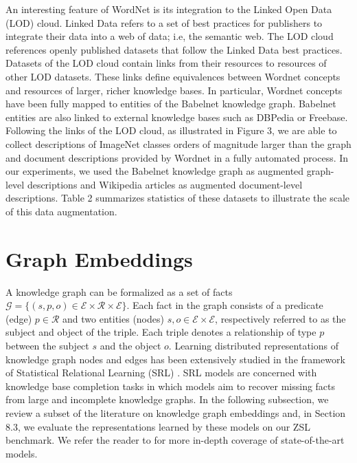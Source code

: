 An interesting feature of WordNet is its integration to the Linked Open Data (LOD) cloud. Linked Data \cite{yu2011linked} refers to a set of best practices for publishers to integrate their data into a web of data; i.e, the semantic web. The LOD cloud references openly published datasets that follow the Linked Data best practices. Datasets of the LOD cloud contain links from their resources to resources of other LOD datasets. These links define equivalences between Wordnet concepts and resources of larger, richer knowledge bases. In particular, Wordnet concepts have been fully mapped to entities of the Babelnet \cite{navigli2012babelnet} knowledge graph. Babelnet entities are also linked to external knowledge bases such as DBPedia or Freebase. Following the links of the LOD cloud, as illustrated in Figure 3, we are able to collect descriptions of ImageNet classes orders of magnitude larger than the graph and document descriptions provided by Wordnet in a fully automated process. In our experiments, we used the Babelnet knowledge graph as augmented graph-level descriptions and Wikipedia articles as augmented document-level descriptions. Table 2 summarizes statistics of these datasets to illustrate the scale of this data augmentation.


\section{Graph Embeddings}
A knowledge graph can be formalized as a set of facts $\mathcal{G}=\{(s,p,o) \in \mathcal{E} \times \mathcal{R} \times \mathcal{E}\}$. Each fact in the graph consists of a predicate (edge) $p \in \mathcal{R}$  and two entities (nodes) $s,o \in \mathcal{E} \times \mathcal{E}$, respectively referred to as the subject and object of the triple.  Each triple  denotes a relationship of type $p$ between the subject $s$ and the object $o$. Learning distributed representations of knowledge graph nodes and edges has been extensively studied in the framework of Statistical Relational Learning (SRL) \cite{getoor2007introduction}. SRL models are concerned with knowledge base completion tasks in which models aim to recover missing facts from large and incomplete knowledge graphs. In the following subsection, we review a subset of the literature on knowledge graph embeddings and, in Section 8.3, we evaluate the representations learned by these models on our ZSL benchmark. We refer the reader to \cite{wang2017knowledge} for more in-depth coverage of state-of-the-art models. 

